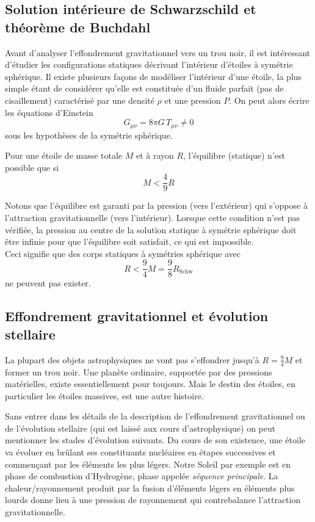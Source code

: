\subsection{Solution intérieure de Schwarzschild et théorème de Buchdahl}
Avant d'analyser l'effondrement gravitationnel vers un trou noir, il est intéressant d'étudier les configurations statiques décrivant l'intérieur d'étoiles à symétrie sphérique. Il existe plusieurs façons de modéliser l'intérieur d'une étoile, la plus simple étant de considérer qu'elle est constituée d'un fluide parfait (pas de cisaillement) caractérisé par une densité $\rho$ et une pression $P$. On peut alors écrire les équations d'Einstein
\begin{equation}
    G_{\mu\nu} = 8 \pi G \,T_{\mu\nu} \neq 0
\end{equation}
sous les hypothèses de la symétrie sphérique.
\begin{theoremframe}
    \begin{theorem}[de Buchdahl (1959)]
        Pour une étoile de masse totale $M$ et à rayon $R$, l'équilibre (statique) n'est possible que si 
        \begin{equation}
            M < \frac{4}{9}R
        \end{equation}
    \end{theorem}
\end{theoremframe}
Notons que l'équilibre est garanti par la pression (vers l'extérieur) qui s'oppose à l'attraction gravitationnelle (vers l'intérieur). Lorsque cette condition n'est pas vérifiée, la pression au centre de la solution statique à symétrie sphérique doit être infinie pour que l'équilibre soit satisfait, ce qui est impossible. \\
Ceci signifie que des corps statiques à symétries sphérique avec
\begin{equation}
    R < \frac{9}{4} M = \frac{9}{8} R_\text{Schw}
\end{equation}
ne peuvent pas exister.
\subsection{Effondrement gravitationnel et évolution stellaire}
La plupart des objets astrophysiques ne vont pas s'effondrer jusqu'à $R = \frac{9}{4} M$ et former un trou noir. Une planète ordinaire, supportée par des pressions matérielles, existe essentiellement pour toujours. Mais le destin des étoiles, en particulier les étoiles massives, est une autre histoire.

Sans entrer dans les détails de la description de l'effondrement gravitationnel ou de l'évolution stellaire (qui est laissé aux cours d'astrophysique) on peut mentionner les stades d'évolution suivants. Du cours de son existence, une étoile va évoluer en brûlant ses constituants nucléaires en étapes successives et commençant par les éléments les plus légers. Notre Soleil par exemple est en phase de combustion d'Hydrogène, phase appelée \emph{séquence principale}. La chaleur/rayonnement produit par la fusion d'éléments légers en éléments plus lourds donne lieu à une pression de rayonnement qui contrebalance l'attraction gravitationnelle. 

